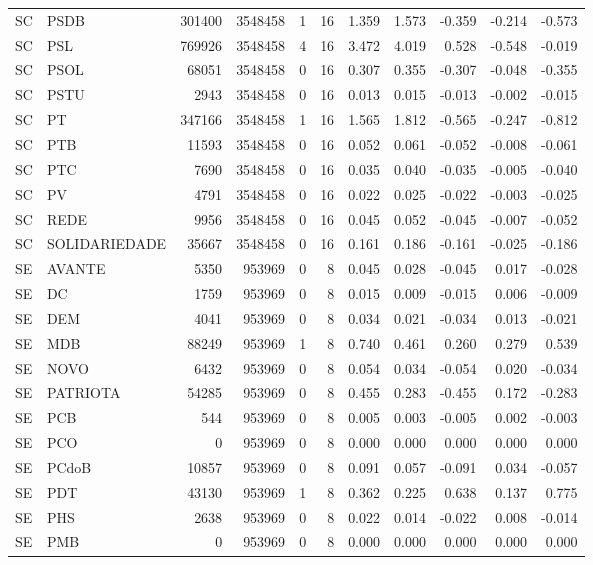 \begin{landscape}
\begin{longtable}{llrrrrrrrrr}
SC & PSDB & 301400 & 3548458 & 1 & 16 & 1.359 & 1.573 & -0.359 & -0.214 & -0.573 \\
SC & PSL & 769926 & 3548458 & 4 & 16 & 3.472 & 4.019 & 0.528 & -0.548 & -0.019 \\
SC & PSOL & 68051 & 3548458 & 0 & 16 & 0.307 & 0.355 & -0.307 & -0.048 & -0.355 \\
SC & PSTU & 2943 & 3548458 & 0 & 16 & 0.013 & 0.015 & -0.013 & -0.002 & -0.015 \\
SC & PT & 347166 & 3548458 & 1 & 16 & 1.565 & 1.812 & -0.565 & -0.247 & -0.812 \\
SC & PTB & 11593 & 3548458 & 0 & 16 & 0.052 & 0.061 & -0.052 & -0.008 & -0.061 \\
SC & PTC & 7690 & 3548458 & 0 & 16 & 0.035 & 0.040 & -0.035 & -0.005 & -0.040 \\
SC & PV & 4791 & 3548458 & 0 & 16 & 0.022 & 0.025 & -0.022 & -0.003 & -0.025 \\
SC & REDE & 9956 & 3548458 & 0 & 16 & 0.045 & 0.052 & -0.045 & -0.007 & -0.052 \\
SC & SOLIDARIEDADE & 35667 & 3548458 & 0 & 16 & 0.161 & 0.186 & -0.161 & -0.025 & -0.186 \\
SE & AVANTE & 5350 & 953969 & 0 & 8 & 0.045 & 0.028 & -0.045 & 0.017 & -0.028 \\
SE & DC & 1759 & 953969 & 0 & 8 & 0.015 & 0.009 & -0.015 & 0.006 & -0.009 \\
SE & DEM & 4041 & 953969 & 0 & 8 & 0.034 & 0.021 & -0.034 & 0.013 & -0.021 \\
SE & MDB & 88249 & 953969 & 1 & 8 & 0.740 & 0.461 & 0.260 & 0.279 & 0.539 \\
SE & NOVO & 6432 & 953969 & 0 & 8 & 0.054 & 0.034 & -0.054 & 0.020 & -0.034 \\
SE & PATRIOTA & 54285 & 953969 & 0 & 8 & 0.455 & 0.283 & -0.455 & 0.172 & -0.283 \\
SE & PCB & 544 & 953969 & 0 & 8 & 0.005 & 0.003 & -0.005 & 0.002 & -0.003 \\
SE & PCO & 0 & 953969 & 0 & 8 & 0.000 & 0.000 & 0.000 & 0.000 & 0.000 \\
SE & PCdoB & 10857 & 953969 & 0 & 8 & 0.091 & 0.057 & -0.091 & 0.034 & -0.057 \\
SE & PDT & 43130 & 953969 & 1 & 8 & 0.362 & 0.225 & 0.638 & 0.137 & 0.775 \\
SE & PHS & 2638 & 953969 & 0 & 8 & 0.022 & 0.014 & -0.022 & 0.008 & -0.014 \\
SE & PMB & 0 & 953969 & 0 & 8 & 0.000 & 0.000 & 0.000 & 0.000 & 0.000 \\

\end{longtable}
\end{landscape}
